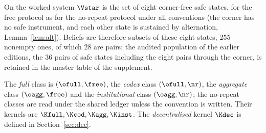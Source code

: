 On the worked system $\Vstar$ is the set of eight corner-free safe states, for the free protocol as for the no-repeat protocol under all conventions (the corner has no safe instrument, and each other state is sustained by alternation, Lemma~\ref{lem:alt}). Beliefs are therefore subsets of these eight states, $255$ nonempty ones, of which $28$ are pairs; the audited population of the earlier editions, the $36$ pairs of safe states including the eight pairs through the corner, is retained in the master table of the supplement.

\begin{definition}\label{def:classes}
The \emph{full} class is $(\ofull,\free)$, the \emph{codex} class $(\ofull,\nr)$, the \emph{aggregate} class $(\oagg,\free)$ and the \emph{institutional} class $(\oagg,\nr)$; the no-repeat classes are read under the shared ledger unless the convention is written. Their kernels are $\Kfull,\Kcod,\Kagg,\Kinst$. The \emph{decentralised} kernel $\Kdec$ is defined in Section~\ref{sec:dec}.
\end{definition}
